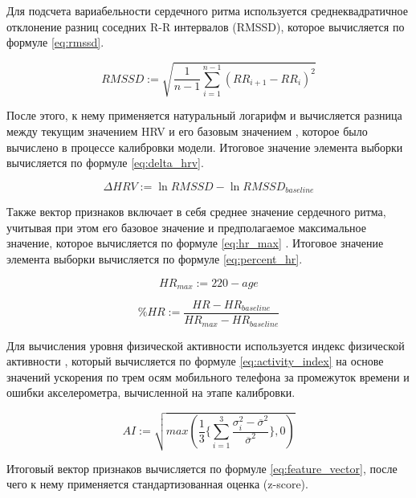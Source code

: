 \documentclass[14pt]{matmex-diploma-custom}
\begin{document}
Для подсчета вариабельности сердечного ритма используется среднеквадратичное
отклонение разниц соседних R-R интервалов (RMSSD), которое вычисляется по
формуле \ref{eq:rmssd}.

\begin{equation} \label{eq:rmssd}
  RMSSD := \sqrt{\frac{1}{n-1}\sum_{i=1}^{n-1}(RR_{i+1} - RR_{i})^2}
\end{equation}

После этого, к нему применяется натуральный логарифм \cite{article:ln_rmssd} и
вычисляется разница между текущим значением HRV и его базовым значением
\cite{article:delta_reliability}, которое было вычислено в процессе калибровки
модели. Итоговое значение элемента выборки вычисляется по формуле
\ref{eq:delta_hrv}.

\begin{equation} \label{eq:delta_hrv}
  {\Delta}HRV := \ln{RMSSD} - \ln{RMSSD_{baseline}}
\end{equation}

Также вектор признаков включает в себя среднее значение сердечного ритма,
учитывая при этом его базовое значение и предполагаемое максимальное значение,
которое вычисляется по формуле \ref{eq:hr_max} \cite{article:age_adjusted_hr}.
Итоговое значение элемента выборки вычисляется по формуле \ref{eq:percent_hr}.

\begin{equation} \label{eq:hr_max}
  HR_{max} := 220 - age
\end{equation}

\begin{equation} \label{eq:percent_hr}
  \%HR := \frac{HR - HR_{baseline}}{HR_{max} - HR_{baseline}}
\end{equation}

Для вычисления уровня физической активности используется индекс физической
активности \cite{article:activity_index}, который вычисляется по формуле
\ref{eq:activity_index} на основе значений ускорения по трем осям мобильного
телефона за промежуток времени и ошибки акселерометра, вычисленной на этапе
калибровки.

\begin{equation} \label{eq:activity_index}
  AI := \sqrt{max(\frac{1}{3}\{\sum_{i=1}^3\frac{\sigma_i^2 - \overline{\sigma}^2}{\overline{\sigma}^2}\}, 0)}
\end{equation}

Итоговый вектор признаков вычисляется по формуле \ref{eq:feature_vector}, после
чего к нему применяется стандартизованная оценка (z-score).
\end{document}

